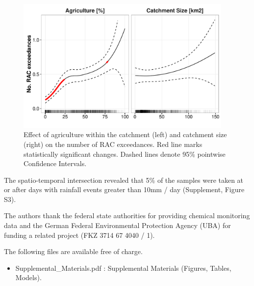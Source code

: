 \documentclass[journal=esthag,manuscript=article]{achemso}
\begin{document}
\begin{figure}[ht]
  \includegraphics[width=0.95\textwidth]{figure4.pdf}
  \caption{Effect of agriculture within the catchment (left) and catchment size (right) on the number of RAC exceedances. Red line marks statistically significant changes. Dashed lines denote 95\% pointwise Confidence Intervals.
  }
  \label{fig:fig4}
\end{figure}






The spatio-temporal intersection revealed that 5\% of the samples were taken at or after days with rainfall events greater than 10mm / day (Supplement, Figure S3).




\begin{acknowledgement}
The authors thank the federal state authorities for providing chemical monitoring data and the German Federal Environmental Protection Agency (UBA) for funding a related project (FKZ 3714 67 4040 / 1). 
\end{acknowledgement}



\begin{suppinfo}
The following files are available free of charge.
\begin{itemize}
  \item Supplemental\_Materials.pdf : Supplemental Materials (Figures, Tables, Models).
\end{itemize}
\end{suppinfo}



\end{document}
